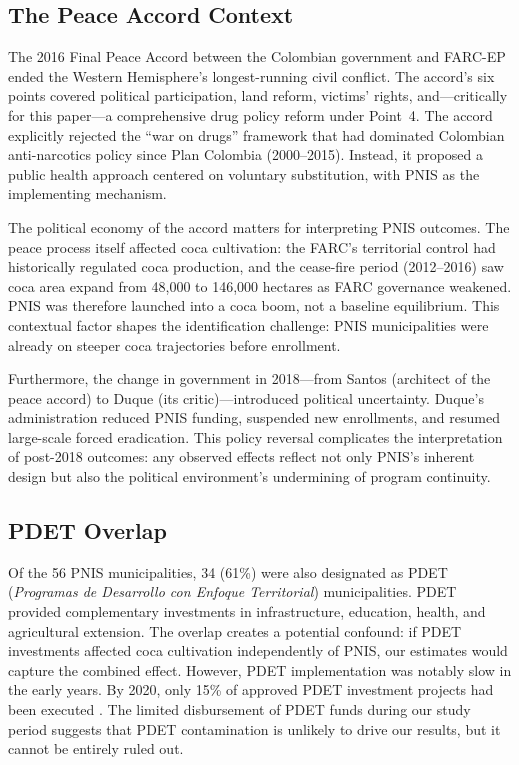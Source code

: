 \documentclass[12pt]{article}
\begin{document}
\subsection{The Peace Accord Context}

The 2016 Final Peace Accord between the Colombian government and FARC-EP ended the Western Hemisphere's longest-running civil conflict. The accord's six points covered political participation, land reform, victims' rights, and---critically for this paper---a comprehensive drug policy reform under Point~4. The accord explicitly rejected the ``war on drugs'' framework that had dominated Colombian anti-narcotics policy since Plan Colombia (2000--2015). Instead, it proposed a public health approach centered on voluntary substitution, with PNIS as the implementing mechanism.

The political economy of the accord matters for interpreting PNIS outcomes. The peace process itself affected coca cultivation: the FARC's territorial control had historically regulated coca production, and the cease-fire period (2012--2016) saw coca area expand from 48,000 to 146,000 hectares as FARC governance weakened. PNIS was therefore launched into a coca boom, not a baseline equilibrium. This contextual factor shapes the identification challenge: PNIS municipalities were already on steeper coca trajectories before enrollment.

Furthermore, the change in government in 2018---from Santos (architect of the peace accord) to Duque (its critic)---introduced political uncertainty. Duque's administration reduced PNIS funding, suspended new enrollments, and resumed large-scale forced eradication. This policy reversal complicates the interpretation of post-2018 outcomes: any observed effects reflect not only PNIS's inherent design but also the political environment's undermining of program continuity.

\subsection{PDET Overlap}

Of the 56 PNIS municipalities, 34 (61\%) were also designated as PDET (\emph{Programas de Desarrollo con Enfoque Territorial}) municipalities. PDET provided complementary investments in infrastructure, education, health, and agricultural extension. The overlap creates a potential confound: if PDET investments affected coca cultivation independently of PNIS, our estimates would capture the combined effect. However, PDET implementation was notably slow in the early years. By 2020, only 15\% of approved PDET investment projects had been executed \citep{fip2019}. The limited disbursement of PDET funds during our study period suggests that PDET contamination is unlikely to drive our results, but it cannot be entirely ruled out.
\end{document}
